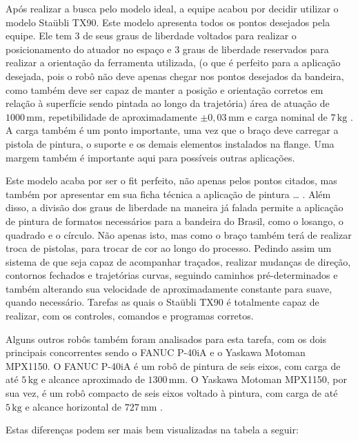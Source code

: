 Após realizar a busca pelo modelo ideal, a equipe acabou por decidir utilizar o modelo Staübli TX90. Este modelo apresenta todos os pontos desejados pela equipe. Ele tem 3 de seus graus de liberdade voltados para realizar o posicionamento do atuador no espaço e 3 graus de liberdade reservados para realizar a orientação da ferramenta utilizada, (o que é perfeito para a aplicação desejada, pois o robô não deve apenas chegar nos pontos desejados da bandeira, como também deve ser capaz de manter a posição e orientação corretos em relação à superfície sendo pintada ao longo da trajetória) área de atuação de $1000\,\text{mm}$, repetibilidade de aproximadamente $\pm0{,}03\,\text{mm}$ e carga nominal de $7\,\text{kg}$ \cite{staubli2017}. A carga também é um ponto importante, uma vez que o braço deve carregar a pistola de pintura, o suporte e os demais elementos instalados na flange. Uma margem também é importante aqui para possíveis outras aplicações.

Este modelo acaba por ser o fit perfeito, não apenas pelos pontos citados, mas também por apresentar em sua ficha técnica a aplicação de pintura … . Além disso, a divisão dos graus de liberdade na maneira já falada permite a aplicação de pintura de formatos necessários para a bandeira do Brasil, como o losango, o quadrado e o círculo. Não apenas isto, mas como o braço também terá de realizar troca de pistolas, para trocar de cor ao longo do processo. Pedindo assim um sistema de que seja capaz de acompanhar traçados, realizar mudanças de direção, contornos fechados e trajetórias curvas, seguindo caminhos pré-determinados e também alterando sua velocidade de aproximadamente  constante para suave, quando necessário. Tarefas as quais o Staübli TX90 é totalmente capaz de realizar, com os controles, comandos e programas corretos.

Alguns outros robôs também foram analisados para esta tarefa, com os dois principais concorrentes sendo o FANUC P-40iA e o Yaskawa Motoman MPX1150. O FANUC P-40iA é um robô de pintura de seis eixos, com carga de até $5\,\text{kg}$ e alcance aproximado de $1300\,\text{mm}$. O Yaskawa Motoman MPX1150, por sua vez, é um robô compacto de seis eixos voltado à pintura, com carga de até $5\,\text{kg}$ e alcance horizontal de $727\,\text{mm}$ \cite{fanuc2026,yaskawa2026}.

Estas diferenças podem ser mais bem visualizadas na tabela a seguir:


